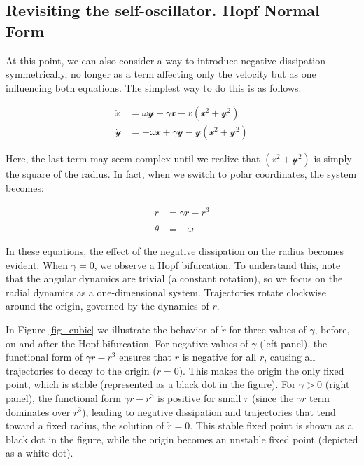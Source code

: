 \documentclass{article}
\begin{document}
\subsection{Revisiting the self-oscillator. Hopf Normal Form}

At this point, we can also consider a way to introduce negative dissipation symmetrically, no longer as a term affecting only the velocity but as one influencing both equations. 
The simplest way to do this is as follows:

\begin{subequations} \label{eq_symosc_neg_diss}
\begin{align}
    \dot{\mathscr{x}} & = \omega\mathscr{y} + \gamma\mathscr{x} - \mathscr{x}(\mathscr{x}^2 + \mathscr{y}^2) \\
    \dot{\mathscr{y}} & = -\omega\mathscr{x} + \gamma\mathscr{y} - \mathscr{y}(\mathscr{x}^2 + \mathscr{y}^2)
\end{align}
\end{subequations}

Here, the last term may seem complex until we realize that $(\mathscr{x}^2 + \mathscr{y}^2)$ is simply the square of the radius. In fact, when we switch to polar coordinates, the system becomes:

\begin{subequations} \label{eq_symosc_neg_diss_polar}
\begin{align}
    \dot{r} & = \gamma r - r^3 \\
    \dot{\theta} & = -\omega
\end{align}
\end{subequations}

In these equations, the effect of the negative dissipation on the radius becomes evident. When $\gamma = 0$, we observe a Hopf bifurcation. To understand this, note that the angular dynamics are trivial (a constant rotation), so we focus on the radial dynamics as a one-dimensional system. Trajectories rotate clockwise around the origin, governed by the dynamics of $r$.

In Figure \ref{fig_cubic} we illustrate the behavior of $\dot{r}$ for three values of $\gamma$, before, on and after the Hopf bifurcation.
For negative values of $\gamma$ (left panel), the functional form of $\gamma r - r^3$ ensures that $\dot{r}$ is negative for all $r$, causing all trajectories to decay to the origin ($r = 0$). 
This makes the origin the only fixed point, which is stable (represented as a black dot in the figure). 
For $\gamma > 0$ (right panel), the functional form $\gamma r - r^3$ is positive for small $r$ (since the $\gamma r$ term dominates over $r^3$), leading to negative dissipation and trajectories that tend toward a fixed radius, the solution of $\dot{r} = 0$. 
This stable fixed point is shown as a black dot in the figure, while the origin becomes an unstable fixed point (depicted as a white dot).
\end{document}
